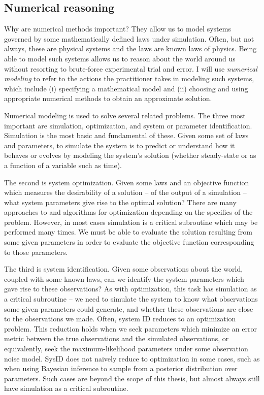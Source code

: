 \documentclass{puthesis}
\begin{document}
\subsection{Numerical reasoning}
Why are numerical methods important?
They allow us to model systems governed by some mathematically defined laws under simulation.
Often, but not always, these are physical systems and the laws are known laws of physics.
Being able to model such systems allows us to reason about the world around us without
resorting to brute-force experimental trial and error.
I will use \emph{numerical modeling} to refer to the actions the practitioner takes
in modeling such systems, which include (i) specifying a
mathematical model and (ii) choosing and using appropriate numerical methods to
obtain an approximate solution.

Numerical modeling is used to solve several related problems.
The three most important are simulation, optimization, and system or
parameter identification.
Simulation is the most basic and fundamental of these.
Given some set of laws and parameters, to simulate the system is to
predict or understand how it behaves or evolves by modeling the system's solution
(whether steady-state or as a function of a variable such as time).

The second is system optimization.
Given some laws and an objective function which
measures the desirability of a solution -- of the output of a simulation --
what system parameters give rise to the optimal solution?
There are many approaches to and algorithms for optimization depending on the specifics
of the problem.
However, in most cases simulation is a critical subroutine which may
be performed many times.
We must be able to evaluate the solution resulting from some given parameters
in order to evaluate the objective function corresponding to those parameters.

The third is system identification.
Given some observations about the world, coupled
with some known laws, can we identify the system parameters which gave rise to these
observations?
As with optimization, this task has simulation as a critical subroutine --
we need to simulate the system to know what observations some given parameters could
generate, and whether these observations are close to the observations we made.
Often, system ID reduces to an optimization problem.
This reduction holds when we seek parameters which minimize an error metric between
the true observations and the simulated observations, or equivalently, seek the
maximum-likelihood parameters under some observation noise model. SysID does not
naively reduce to optimization in some cases, such as when using Bayesian
inference to sample from a posterior distribution over parameters.
Such cases are beyond the scope of this thesis,
but almost always still have simulation as a critical subroutine.
\end{document}
